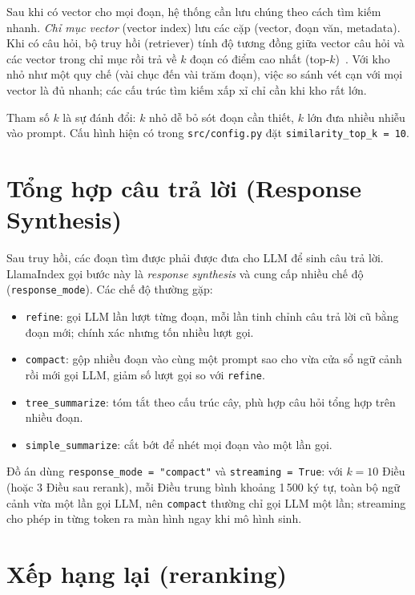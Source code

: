 Sau khi có vector cho mọi đoạn, hệ thống cần lưu chúng theo cách tìm kiếm nhanh. \emph{Chỉ mục vector} (vector index) lưu các cặp (vector, đoạn văn, metadata). Khi có câu hỏi, bộ truy hồi (retriever) tính độ tương đồng giữa vector câu hỏi và các vector trong chỉ mục rồi trả về $k$ đoạn có điểm cao nhất (top-$k$)~\cite{karpukhin2020dpr}. Với kho nhỏ như một quy chế (vài chục đến vài trăm đoạn), việc so sánh vét cạn với mọi vector là đủ nhanh; các cấu trúc tìm kiếm xấp xỉ chỉ cần khi kho rất lớn.

Tham số $k$ là sự đánh đổi: $k$ nhỏ dễ bỏ sót đoạn cần thiết, $k$ lớn đưa nhiều nhiễu vào prompt. Cấu hình hiện có trong \texttt{src/config.py} đặt \texttt{similarity\_top\_k = 10}.

\section{Tổng hợp câu trả lời (Response Synthesis)}

Sau truy hồi, các đoạn tìm được phải được đưa cho LLM để sinh câu trả lời. LlamaIndex gọi bước này là \emph{response synthesis} và cung cấp nhiều chế độ (\texttt{response\_mode}). Các chế độ thường gặp:

\begin{itemize}
  \item \texttt{refine}: gọi LLM lần lượt từng đoạn, mỗi lần tinh chỉnh câu trả lời cũ bằng đoạn mới; chính xác nhưng tốn nhiều lượt gọi.
  \item \texttt{compact}: gộp nhiều đoạn vào cùng một prompt sao cho vừa cửa sổ ngữ cảnh rồi mới gọi LLM, giảm số lượt gọi so với \texttt{refine}.
  \item \texttt{tree\_summarize}: tóm tắt theo cấu trúc cây, phù hợp câu hỏi tổng hợp trên nhiều đoạn.
  \item \texttt{simple\_summarize}: cắt bớt để nhét mọi đoạn vào một lần gọi.
\end{itemize}

Đồ án dùng \texttt{response\_mode = "compact"} và \texttt{streaming = True}: với $k=10$ Điều (hoặc 3 Điều sau rerank), mỗi Điều trung bình khoảng 1\,500 ký tự, toàn bộ ngữ cảnh vừa một lần gọi LLM, nên \texttt{compact} thường chỉ gọi LLM một lần; streaming cho phép in từng token ra màn hình ngay khi mô hình sinh.

\section{Xếp hạng lại (reranking)}

